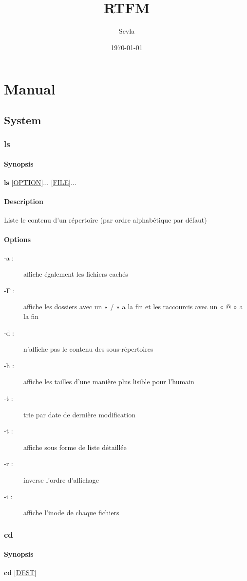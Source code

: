 \documentclass[a4paper, 10pt, onecolumn, openright, oneside]{book}
\title{RTFM}
\author{Sevla}
\date{\today}
\begin{document}
\maketitle

\part{Manual}

\chapter{System}

\section{ls}
\subsection{Synopsis}
\textbf{ls} [\ul{OPTION}]... [\ul{FILE}]...
\subsection{Description}
Liste le contenu d'un répertoire (par ordre alphabétique par défaut)
\subsection{Options}
\begin{description}
\item[-a :] affiche également les fichiers cachés
\item[-F :] affiche les dossiers avec un « / » a la fin et les raccourcis avec un « @ » a la fin
\item[-d :] n'affiche pas le contenu des sous-répertoires
\item[-h :] affiche les tailles d’une manière plus lisible pour l’humain
\item[-t :] trie par date de dernière modification
\item[-t :] affiche sous forme de liste détaillée
\item[-r :] inverse l'ordre d'affichage
\item[-i :] affiche l’inode de chaque fichiers
\end{description}

\section{cd}
\subsection{Synopsis}
\textbf{cd} [\ul{DEST}]
\end{document}
